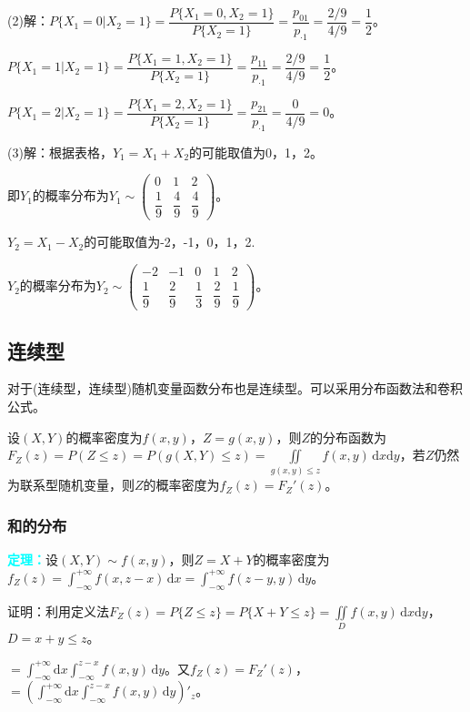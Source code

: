 (2)解：$P\{X_1=0|X_2=1\}=\dfrac{P\{X_1=0,X_2=1\}}{P\{X_2=1\}}=\dfrac{p_{01}}{p_{\cdot1}}=\dfrac{2/9}{4/9}=\dfrac{1}{2}$。

$P\{X_1=1|X_2=1\}=\dfrac{P\{X_1=1,X_2=1\}}{P\{X_2=1\}}=\dfrac{p_{11}}{p_{\cdot1}}=\dfrac{2/9}{4/9}=\dfrac{1}{2}$。

$P\{X_1=2|X_2=1\}=\dfrac{P\{X_1=2,X_2=1\}}{P\{X_2=1\}}=\dfrac{p_{21}}{p_{\cdot1}}=\dfrac{0}{4/9}=0$。

(3)解：根据表格，$Y_1=X_1+X_2$的可能取值为0，1，2。

即$Y_1$的概率分布为$Y_1\sim\left(\begin{array}{ccc}
    0 & 1 & 2 \\
    \dfrac{1}{9} & \dfrac{4}{9} & \dfrac{4}{9}
\end{array}\right)$。

$Y_2=X_1-X_2$的可能取值为-2，-1，0，1，2.

$Y_2$的概率分布为$Y_2\sim\left(\begin{array}{ccccc}
    -2 & -1 & 0 & 1 & 2 \\
    \dfrac{1}{9} & \dfrac{2}{9} & \dfrac{1}{3} & \dfrac{2}{9} & \dfrac{1}{9}
\end{array}\right)$。

\subsection{连续型}

对于(连续型，连续型)随机变量函数分布也是连续型。可以采用分布函数法和卷积公式。

设$(X,Y)$的概率密度为$f(x,y)$，$Z=g(x,y)$，则$Z$的分布函数为$F_Z(z)=P(Z\leqslant z)=P(g(X,Y)\leqslant z)=\iint\limits_{g(x,y)\leqslant z}f(x,y)\,\textrm{d}x\textrm{d}y$，若$Z$仍然为联系型随机变量，则$Z$的概率密度为$f_Z(z)=F_Z'(z)$。

\subsubsection{和的分布}

\textcolor{aqua}{\textbf{定理：}}设$(X,Y)\sim f(x,y)$，则$Z=X+Y$的概率密度为$f_Z(z)=\int_{-\infty}^{+\infty}f(x,z-x)\,\textrm{d}x=\int_{-\infty}^{+\infty}f(z-y,y)\,\textrm{d}y$。

证明：利用定义法$F_Z(z)=P\{Z\leqslant z\}=P\{X+Y\leqslant z\}=\iint\limits_Df(x,y)\,\textrm{d}x\textrm{d}y$，$D=x+y\leqslant z$。

$=\int_{-\infty}^{+\infty}\textrm{d}x\int_{-\infty}^{z-x}f(x,y)\,\textrm{d}y$。又$f_Z(z)=F_Z'(z)$，$=(\int_{-\infty}^{+\infty}\textrm{d}x\int_{-\infty}^{z-x}f(x,y)\,\textrm{d}y)'_z$。

